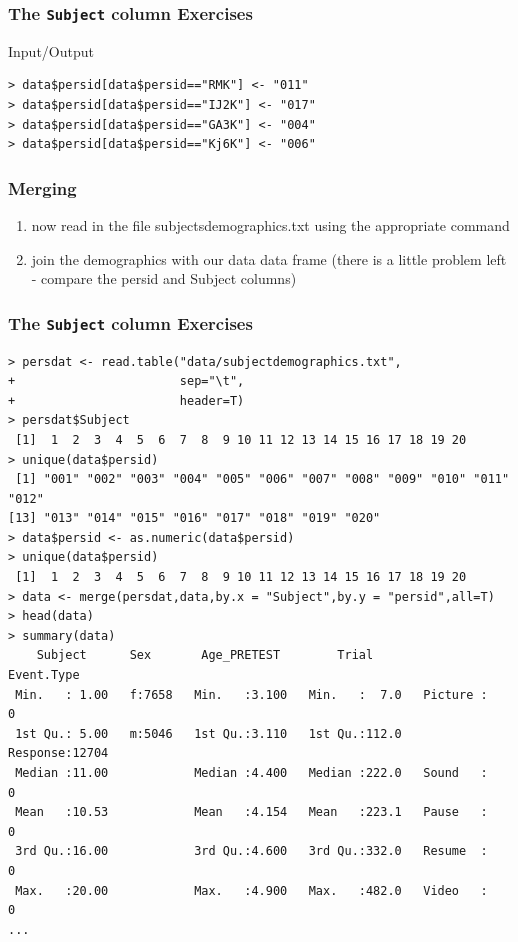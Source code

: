\documentclass[xcolor={table},c]{beamer}
\begin{document}
\begin{frame}[fragile]\frametitle{The \texttt{Subject} column Exercises}
\begin{exampleblock}{Input/Output}\small
\begin{verbatim}
> data$persid[data$persid=="RMK"] <- "011"
> data$persid[data$persid=="IJ2K"] <- "017"
> data$persid[data$persid=="GA3K"] <- "004"
> data$persid[data$persid=="Kj6K"] <- "006"
\end{verbatim}
    \end{exampleblock}
\end{frame}


\begin{frame}[fragile]\frametitle{Merging}
  \begin{enumerate}
  \item now read in the file subjectsdemographics.txt using the appropriate command
  \item join the demographics with our data data frame (there is a little problem left - compare the persid and Subject columns)
  \end{enumerate}
\end{frame}


\begin{frame}[fragile]\frametitle{The \texttt{Subject} column Exercises}
\begin{verbatim}
> persdat <- read.table("data/subjectdemographics.txt",
+                       sep="\t",
+                       header=T)
> persdat$Subject
 [1]  1  2  3  4  5  6  7  8  9 10 11 12 13 14 15 16 17 18 19 20
> unique(data$persid)
 [1] "001" "002" "003" "004" "005" "006" "007" "008" "009" "010" "011" "012"
[13] "013" "014" "015" "016" "017" "018" "019" "020"
> data$persid <- as.numeric(data$persid)
> unique(data$persid)
 [1]  1  2  3  4  5  6  7  8  9 10 11 12 13 14 15 16 17 18 19 20
> data <- merge(persdat,data,by.x = "Subject",by.y = "persid",all=T)
> head(data)
> summary(data)
    Subject      Sex       Age_PRETEST        Trial          Event.Type   
 Min.   : 1.00   f:7658   Min.   :3.100   Min.   :  7.0   Picture :    0  
 1st Qu.: 5.00   m:5046   1st Qu.:3.110   1st Qu.:112.0   Response:12704  
 Median :11.00            Median :4.400   Median :222.0   Sound   :    0  
 Mean   :10.53            Mean   :4.154   Mean   :223.1   Pause   :    0  
 3rd Qu.:16.00            3rd Qu.:4.600   3rd Qu.:332.0   Resume  :    0  
 Max.   :20.00            Max.   :4.900   Max.   :482.0   Video   :    0  
...
\end{verbatim}
\end{frame}
\end{document}
